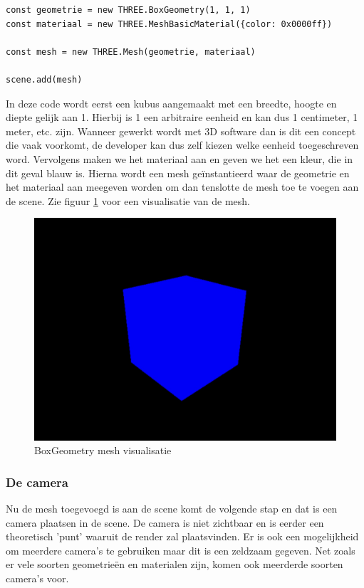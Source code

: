 \begin{lstlisting}
const geometrie = new THREE.BoxGeometry(1, 1, 1)
const materiaal = new THREE.MeshBasicMaterial({color: 0x0000ff})

const mesh = new THREE.Mesh(geometrie, materiaal)

scene.add(mesh)
\end{lstlisting}

In deze code wordt eerst een kubus aangemaakt met een breedte, hoogte en diepte gelijk aan 1. Hierbij is 1 een arbitraire eenheid en kan dus 1 centimeter, 1 meter, etc. zijn. Wanneer gewerkt wordt met 3D software dan is dit een concept die vaak voorkomt, de developer kan dus zelf kiezen welke eenheid toegeschreven word. Vervolgens maken we het materiaal aan en geven we het een kleur, die in dit geval blauw is. Hierna wordt een mesh geïnstantieerd waar de geometrie en het materiaal aan meegeven worden om dan tenslotte de mesh toe te voegen aan de scene. Zie figuur \ref{fig:boxGeometry} voor een visualisatie van de mesh.

\begin{figure}[h]
\centering
\includegraphics[width=1\linewidth]{graphics/boxGeometry}
\caption[BoxGeometry mesh visualisatie]{BoxGeometry mesh visualisatie}
\label{fig:boxGeometry}
\end{figure}

\newpage
\subsubsection{De camera}

Nu de mesh toegevoegd is aan de scene komt de volgende stap en dat is een camera plaatsen in de scene. De camera is niet zichtbaar en is eerder een theoretisch 'punt' waaruit de render zal plaatsvinden. Er is ook een mogelijkheid om meerdere camera's te gebruiken maar dit is een zeldzaam gegeven. Net zoals er vele soorten geometrieën en materialen zijn, komen ook meerderde soorten camera's voor.

